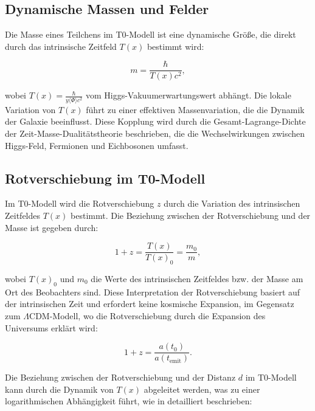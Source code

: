 \documentclass[a4paper,12pt]{article}
\newcommand{\Tfield}{T(x)}
\begin{document}
	\subsection{Dynamische Massen und Felder}
	
	Die Masse eines Teilchens im T0-Modell ist eine dynamische Größe, die direkt durch das intrinsische Zeitfeld \( \Tfield \) bestimmt wird:
	
	\begin{equation}
		m = \frac{\hbar}{\Tfield c^2},
	\end{equation}
	
	wobei \( \Tfield = \frac{\hbar}{y \langle \Phi \rangle c^2} \) vom Higgs-Vakuumerwartungswert abhängt. Die lokale Variation von \( \Tfield \) führt zu einer effektiven Massenvariation, die die Dynamik der Galaxie beeinflusst. Diese Kopplung wird durch die Gesamt-Lagrange-Dichte der Zeit-Masse-Dualitätstheorie beschrieben, die die Wechselwirkungen zwischen Higgs-Feld, Fermionen und Eichbosonen umfasst.
	
	\subsection{Rotverschiebung im T0-Modell}
	
	Im T0-Modell wird die Rotverschiebung \( z \) durch die Variation des intrinsischen Zeitfeldes \( \Tfield \) bestimmt. Die Beziehung zwischen der Rotverschiebung und der Masse ist gegeben durch:
	
	\begin{equation}
		1 + z = \frac{\Tfield}{\Tfield_0} = \frac{m_0}{m},
	\end{equation}
	
	wobei \( \Tfield_0 \) und \( m_0 \) die Werte des intrinsischen Zeitfeldes bzw. der Masse am Ort des Beobachters sind. Diese Interpretation der Rotverschiebung basiert auf der intrinsischen Zeit und erfordert keine kosmische Expansion, im Gegensatz zum \( \Lambda \)CDM-Modell, wo die Rotverschiebung durch die Expansion des Universums erklärt wird:
	
	\begin{equation}
		1 + z = \frac{a(t_0)}{a(t_{\text{emit}})}.
	\end{equation}
	
	Die Beziehung zwischen der Rotverschiebung und der Distanz \( d \) im T0-Modell kann durch die Dynamik von \( \Tfield \) abgeleitet werden, was zu einer logarithmischen Abhängigkeit führt, wie in \cite{pascher_messdifferenzen_2025} detailliert beschrieben:
	
\end{document}
